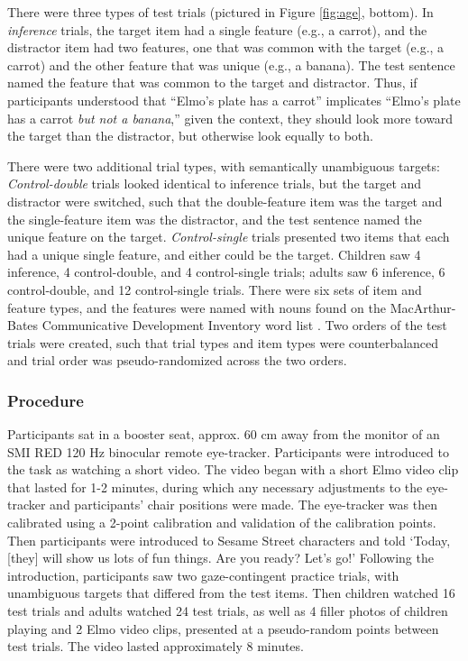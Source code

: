 \documentclass[10pt,letterpaper]{article}
\begin{document}
There were three types of test trials (pictured in Figure \ref{fig:age}, bottom). In \emph{inference} trials, the target item had a single feature (e.g., a carrot), and the distractor item had two features, one that was common with the target (e.g., a carrot) and the other feature that was unique (e.g., a banana). The test sentence named the feature that was common to the target and distractor. Thus, if participants understood that ``Elmo's plate has a carrot'' implicates ``Elmo's plate has a carrot \emph{but not a banana},'' given the context, they should look more toward the target than the distractor, but otherwise look equally to both.

There were two additional trial types, with semantically unambiguous targets: \emph{Control-double} trials looked identical to inference trials, but the target and distractor were switched, such that the double-feature item was the target and the single-feature item was the distractor, and the test sentence named the unique feature on the target. \emph{Control-single} trials presented two items that each had a unique single feature, and either could be the target. Children saw 4 inference, 4 control-double, and 4 control-single trials; adults saw 6 inference, 6 control-double, and 12 control-single trials. 
There were six sets of item and feature types, and the features were named with nouns found on the  MacArthur-Bates Communicative Development Inventory word list \cite{fenson1994variability}. Two orders of the test trials were created, such that trial types and item types were counterbalanced and trial order was pseudo-randomized across the two orders.

\subsubsection{Procedure}

Participants sat in a booster seat, approx. 60 cm away from the monitor of an SMI RED 120 Hz binocular remote eye-tracker. Participants were introduced to the task as watching a short video. The video began with a short Elmo video clip that lasted for 1-2 minutes, during which any necessary adjustments to the eye-tracker and participants' chair positions were made. The eye-tracker was then calibrated using a 2-point calibration and validation of the calibration points. Then participants were introduced to Sesame Street characters and told `Today, [they] will show us lots of fun things. Are you ready? Let's go!' Following the introduction, participants saw two gaze-contingent practice trials, with unambiguous targets that differed from the test items. Then children watched 16 test trials and adults watched 24 test trials, as well as 4 filler photos of children playing and 2 Elmo video clips, presented at a pseudo-random points between test trials. The video lasted approximately 8 minutes.
\end{document}
